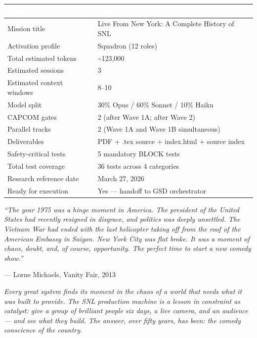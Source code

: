 \documentclass[11pt,letterpaper]{article}
\newcommand{\tableheader}[1]{\textbf{\sffamily\textcolor{white}{#1}}}
\begin{document}
\begin{center}
\begin{tabularx}{\textwidth}{L{5cm}X}
\toprule
{}
\tableheader{Metric} & \tableheader{Value} \\
\midrule
Mission title & Live From New York: A Complete History of SNL \\
Activation profile & Squadron (12 roles) \\
Total estimated tokens & \textasciitilde{}123,000 \\
Estimated sessions & 3 \\
Estimated context windows & 8--10 \\
Model split & 30\% Opus / 60\% Sonnet / 10\% Haiku \\
CAPCOM gates & 2 (after Wave 1A; after Wave 2) \\
Parallel tracks & 2 (Wave 1A and Wave 1B simultaneous) \\
Deliverables & PDF + .tex source + index.html + source index \\
Safety-critical tests & 5 mandatory BLOCK tests \\
Total test coverage & 36 tests across 4 categories \\
Research reference date & March 27, 2026 \\
Ready for execution & Yes --- handoff to GSD orchestrator \\
\bottomrule
\end{tabularx}
\end{center}

\vspace{2em}

\begin{quotebox}
\textit{``The year 1975 was a hinge moment in America. The president of the United States had recently resigned in disgrace, and politics was deeply unsettled. The Vietnam War had ended with the last helicopter taking off from the roof of the American Embassy in Saigon. New York City was flat broke. It was a moment of chaos, doubt, and, of course, opportunity. The perfect time to start a new comedy show.''}

\vspace{0.5em}
\hfill --- Lorne Michaels, Vanity Fair, 2013

\vspace{1em}
\textit{Every great system finds its moment in the chaos of a world that needs what it was built to provide. The SNL production machine is a lesson in constraint as catalyst: give a group of brilliant people six days, a live camera, and an audience --- and see what they build. The answer, over fifty years, has been: the comedy conscience of the country.}
\end{quotebox}
\end{document}

